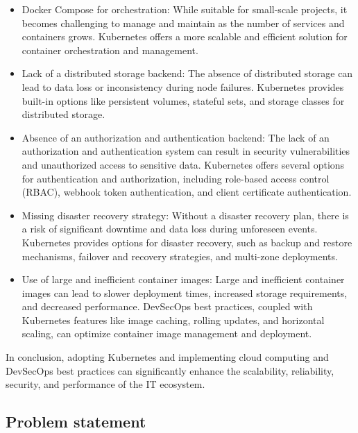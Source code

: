 \begin{itemize}[label={--}]

\item Docker Compose for orchestration: While suitable for small-scale projects, it becomes challenging to manage and maintain as the number of services and containers grows. Kubernetes offers a more scalable and efficient solution for container orchestration and management. 

\item Lack of a distributed storage backend: The absence of distributed storage can lead to data loss or inconsistency during node failures. Kubernetes provides built-in options like persistent volumes, stateful sets, and storage classes for distributed storage. 

\item Absence of an authorization and authentication backend: The lack of an authorization and authentication system can result in security vulnerabilities and unauthorized access to sensitive data. Kubernetes offers several options for authentication and authorization, including role-based access control (RBAC), webhook token authentication, and client certificate authentication. 

\item Missing disaster recovery strategy: Without a disaster recovery plan, there is a risk of significant downtime and data loss during unforeseen events. Kubernetes provides options for disaster recovery, such as backup and restore mechanisms, failover and recovery strategies, and multi-zone deployments. 

\item Use of large and inefficient container images: Large and inefficient container images can lead to slower deployment times, increased storage requirements, and decreased performance. DevSecOps best practices, coupled with Kubernetes features like image caching, rolling updates, and horizontal scaling, can optimize container image management and deployment. 

\end{itemize}

\hspace{7mm}In conclusion, adopting Kubernetes and implementing cloud computing and DevSecOps best practices can significantly enhance the scalability, reliability, security, and performance of the IT ecosystem. 
\newpage
\subsection{Problem statement }

